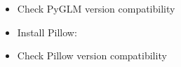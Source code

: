 \documentclass[a4paper,10pt,english,openany,oneside]{sphinxmanual}
\begin{document}
\begin{description}
\begin{itemize}
\item {} 
\sphinxAtStartPar
Check PyGLM version compatibility

\end{itemize}

\begin{itemize}
\item {} 
\sphinxAtStartPar
Install Pillow: 

\item {} 
\sphinxAtStartPar
Check Pillow version compatibility

\end{itemize}

\end{description}
\end{document}
